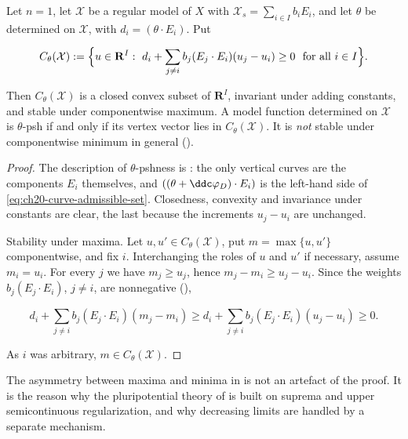 \begin{proposition}
\label{prop:ch20-curve-lattice}
Let \(n=1\), let \(\mathcal X\) be a regular model of \(X\) with
\(\mathcal X_s=\sum_{i\in I}b_iE_i\), and let \(\theta\) be determined on
\(\mathcal X\), with \(d_i=(\theta\cdot E_i)\).  Put

\begin{equation}
\label{eq:ch20-curve-admissible-set}
 C_\theta(\mathcal X):=
 \Bigl\{u\in\mathbf R^I:\ d_i+\sum_{j\neq i}b_j(E_j\cdot E_i)(u_j-u_i)
   \geq0\ \text{ for all }i\in I\Bigr\}.
\end{equation}

Then \(C_\theta(\mathcal X)\) is a closed convex subset of \(\mathbf R^I\),
invariant under adding constants, and stable under componentwise maximum.  A
model function determined on \(\mathcal X\) is \(\theta\)-psh if and only if
its vertex vector lies in \(C_\theta(\mathcal X)\).  It is \emph{not} stable
under componentwise minimum in general
\textup{()}.
\end{proposition}

\begin{proof}
The description of \(\theta\)-pshness is
: the only vertical curves are the
components \(E_i\) themselves, and \(((\theta+\ddc\varphi_D)\cdot E_i)\) is
the left-hand side of \eqref{eq:ch20-curve-admissible-set}.  Closedness,
convexity and invariance under constants are clear, the last because the
increments \(u_j-u_i\) are unchanged.

Stability under maxima.  Let \(u,u'\in C_\theta(\mathcal X)\), put
\(m=\max\{u,u'\}\) componentwise, and fix \(i\).  Interchanging the roles of
\(u\) and \(u'\) if necessary, assume \(m_i=u_i\).  For every \(j\) we have
\(m_j\geq u_j\), hence \(m_j-m_i\geq u_j-u_i\).  Since the weights
\(b_j(E_j\cdot E_i)\), \(j\neq i\), are nonnegative
(),

\begin{equation}
\label{eq:ch20-curve-max-monotone}
 d_i+\sum_{j\neq i}b_j(E_j\cdot E_i)(m_j-m_i)
 \geq
 d_i+\sum_{j\neq i}b_j(E_j\cdot E_i)(u_j-u_i)\geq0 .
\end{equation}

As \(i\) was arbitrary, \(m\in C_\theta(\mathcal X)\).
\end{proof}

The asymmetry between maxima and minima in
 is not an artefact of the proof.  It is the
reason why the pluripotential theory of
 is built on suprema and upper
semicontinuous regularization, and why decreasing limits are handled by a
separate mechanism.


